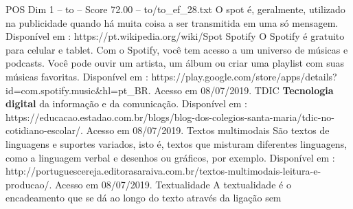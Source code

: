 \begin{textsample}{POS Dim 1 – to – Score 72.00 – to/to\_ef\_28.txt}
O spot é, geralmente, utilizado na publicidade quando há muita coisa a ser transmitida em uma só mensagem.
Disponível em : https://pt.wikipedia.org/wiki/Spot Spotify O Spotify é gratuito para celular e tablet.
Com o Spotify, você tem acesso a um universo de músicas e podcasts.
Você pode ouvir um artista, um álbum ou criar uma playlist com suas músicas favoritas.
Disponível em : https://play.google.com/store/apps/details? id=com.spotify.music\&hl=pt\_BR.
Acesso em 08/07/2019.
TDIC \textbf{Tecnologia} \textbf{digital} da informação e da comunicação.
Disponível em : https://educacao.estadao.com.br/blogs/blog-dos-colegios-santa-maria/tdic-no-cotidiano-escolar/.
Acesso em 08/07/2019.
Textos multimodais São textos de linguagens e suportes variados, isto é, textos que misturam diferentes linguagens, como a linguagem verbal e desenhos ou gráficos, por exemplo.
Disponível em : http://portuguescereja.editorasaraiva.com.br/textos-multimodais-leitura-e-producao/.
Acesso em 08/07/2019.
Textualidade A textualidade é o encadeamento que se dá ao longo do texto através da ligação sem

\end{textsample}
